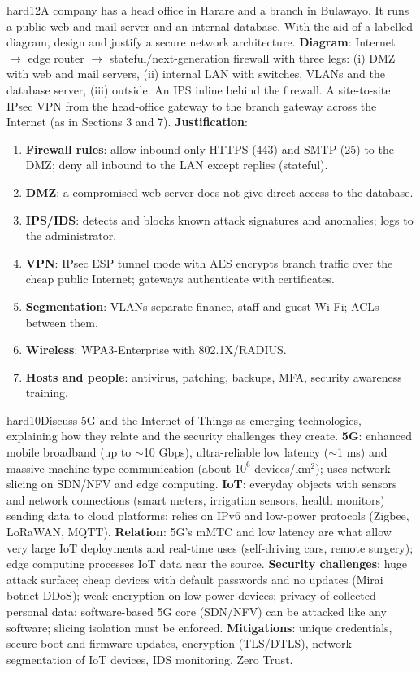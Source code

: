 \documentclass[10pt]{article}
\begin{document}
\begin{practice}{hard}{12}A company has a head office in Harare and a branch in Bulawayo. It runs a public web and mail server and an internal database. With the aid of a labelled diagram, design and justify a secure network architecture.
\sol \textbf{Diagram}: Internet $\to$ edge router $\to$ stateful/next-generation firewall with three legs: (i) DMZ with web and mail servers, (ii) internal LAN with switches, VLANs and the database server, (iii) outside. An IPS inline behind the firewall. A site-to-site IPsec VPN from the head-office gateway to the branch gateway across the Internet (as in Sections 3 and 7).
\textbf{Justification}:
\begin{enumerate}
\item \textbf{Firewall rules}: allow inbound only HTTPS (443) and SMTP (25) to the DMZ; deny all inbound to the LAN except replies (stateful).
\item \textbf{DMZ}: a compromised web server does not give direct access to the database.
\item \textbf{IPS/IDS}: detects and blocks known attack signatures and anomalies; logs to the administrator.
\item \textbf{VPN}: IPsec ESP tunnel mode with AES encrypts branch traffic over the cheap public Internet; gateways authenticate with certificates.
\item \textbf{Segmentation}: VLANs separate finance, staff and guest Wi-Fi; ACLs between them.
\item \textbf{Wireless}: WPA3-Enterprise with 802.1X/RADIUS.
\item \textbf{Hosts and people}: antivirus, patching, backups, MFA, security awareness training.
\end{enumerate}
\end{practice}

\begin{practice}{hard}{10}Discuss 5G and the Internet of Things as emerging technologies, explaining how they relate and the security challenges they create.
\sol \textbf{5G}: enhanced mobile broadband (up to $\sim$10 Gbps), ultra-reliable low latency ($\sim$1 ms) and massive machine-type communication (about $10^6$ devices/km$^2$); uses network slicing on SDN/NFV and edge computing.
\textbf{IoT}: everyday objects with sensors and network connections (smart meters, irrigation sensors, health monitors) sending data to cloud platforms; relies on IPv6 and low-power protocols (Zigbee, LoRaWAN, MQTT).
\textbf{Relation}: 5G's mMTC and low latency are what allow very large IoT deployments and real-time uses (self-driving cars, remote surgery); edge computing processes IoT data near the source.
\textbf{Security challenges}: huge attack surface; cheap devices with default passwords and no updates (Mirai botnet DDoS); weak encryption on low-power devices; privacy of collected personal data; software-based 5G core (SDN/NFV) can be attacked like any software; slicing isolation must be enforced.
\textbf{Mitigations}: unique credentials, secure boot and firmware updates, encryption (TLS/DTLS), network segmentation of IoT devices, IDS monitoring, Zero Trust.
\end{practice}
\end{document}
